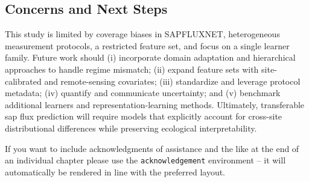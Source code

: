 \documentclass[graybox]{svmult}
\begin{document}
\subsection{Concerns and Next Steps} %
This study is limited by coverage biases in SAPFLUXNET, heterogeneous measurement protocols, a restricted feature set, and focus on a single learner family. Future work should (i) incorporate domain adaptation and hierarchical approaches to handle regime mismatch; (ii) expand feature sets with site-calibrated and remote-sensing covariates; (iii) standardize and leverage protocol metadata; (iv) quantify and communicate uncertainty; and (v) benchmark additional learners and representation-learning methods. Ultimately, transferable sap flux prediction will require models that explicitly account for cross-site distributional differences while preserving ecological interpretability.
%

\begin{acknowledgement}
If you want to include acknowledgments of assistance and the like at the end of an individual chapter please use the \verb|acknowledgement| environment -- it will automatically be rendered in line with the preferred layout.
\end{acknowledgement}





\end{document}
